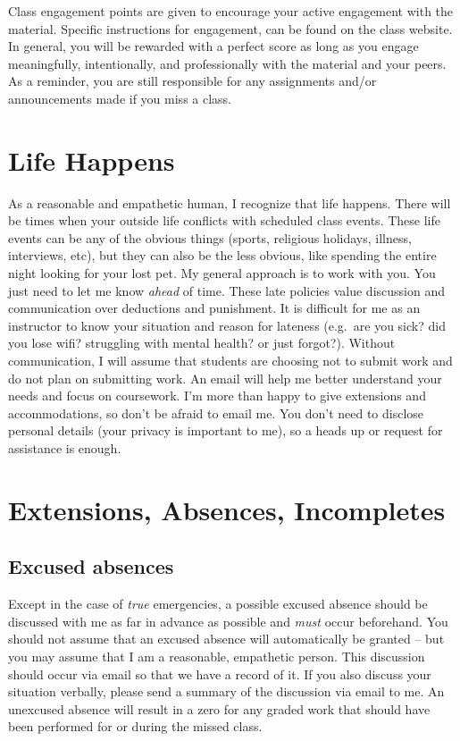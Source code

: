 \documentclass[
]{book}
\begin{document}
Class engagement points are given to encourage your active engagement with the material.
Specific instructions for engagement, can be found on the class website. In general, you will be rewarded with a perfect score as long as you engage meaningfully, intentionally, and professionally with the material and your peers. As a reminder, you are still responsible for any assignments and/or announcements made if you miss a class.

\hypertarget{life-happens}{%
\section{Life Happens}\label{life-happens}}

As a reasonable and empathetic human, I recognize that life happens.
There will be times when your outside life conflicts with scheduled class events.
These life events can be any of the obvious things (sports, religious holidays, illness, interviews, etc), but they can also be the less obvious, like spending the entire night looking for your lost pet.
My general approach is to work with you. You just need to let me know \emph{ahead} of time.
These late policies value discussion and communication over deductions and punishment.
It is difficult for me as an instructor to know your situation and reason for lateness (e.g.~are you sick? did you lose wifi? struggling with mental health? or just forgot?).
Without communication, I will assume that students are choosing not to submit work and do not plan on submitting work.
An email will help me better understand your needs and focus on coursework.
I'm more than happy to give extensions and accommodations, so don't be afraid to email me.
You don't need to disclose personal details (your privacy is important to me), so a heads up or request for assistance is enough.

\hypertarget{extensions-absences-incompletes}{%
\section{Extensions, Absences, Incompletes}\label{extensions-absences-incompletes}}

\hypertarget{excused-absences}{%
\subsection{Excused absences}\label{excused-absences}}

Except in the case of \emph{true} emergencies, a possible excused absence should be discussed with me as far in advance as possible and \emph{must} occur beforehand.
You should not assume that an excused absence will automatically be granted -- but you may assume that I am a reasonable, empathetic person.
This discussion should occur via email so that we have a record of it.
If you also discuss your situation verbally, please send a summary of the discussion via email to me.
An unexcused absence will result in a zero for any graded work that should have been performed for or during the missed class.
\end{document}
